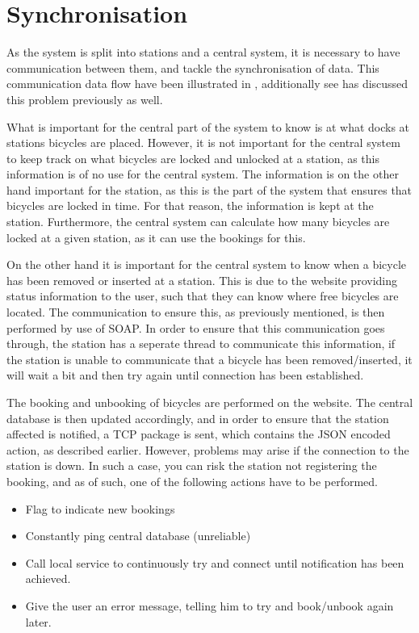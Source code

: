 \section{Synchronisation}
As the system is split into stations and a central system, it is necessary to have communication between them, and tackle the synchronisation of data.
This communication data flow have been illustrated in , additionally see  has discussed this problem previously as well.

\begin{description}[style=nextline]
	\item[Bicycle locking/unlocking not synchronised]
	What is important for the central part of the system to know is at what docks at stations bicycles are placed.
	However, it is not important for the central system to keep track on what bicycles are locked and unlocked at a station, as this information is of no use for the central system.
	The information is on the other hand important for the station, as this is the part of the system that ensures that bicycles are locked in time.
	For that reason, the information is kept at the station. Furthermore, the central system can calculate how many bicycles are locked at a given station, as it can use the bookings for this.
	
	\item[Removal/Insertion of bicycles]
	On the other hand it is important for the central system to know when a bicycle has been removed or inserted at a station.
	This is due to the website providing status information to the user, such that they can know where free bicycles are located.
	The communication to ensure this, as previously mentioned, is then performed by use of SOAP.
	In order to ensure that this communication goes through, the station has a seperate thread to communicate this information, if the station is unable to communicate that a bicycle has been removed/inserted, it will wait a bit and then try again until connection has been established.
	
	\item[Booking/Unbooking]
	The booking and unbooking of bicycles are performed on the website. 
	The central database is then updated accordingly, and in order to ensure that the station affected is notified, a TCP package is sent, which contains the JSON encoded action, as described earlier.
	However, problems may arise if the connection to the station is down.
	In such a case, you can risk the station not registering the booking, and as of such, one of the following actions have to be performed.
	\begin{itemize}
		\item Flag to indicate new bookings
		\item Constantly ping central database (unreliable)
		\item Call local service to continuously try and connect until notification has been achieved.
		\item Give the user an error message, telling him to try and book/unbook again later. 
	\end{itemize}
	

\end{description}
